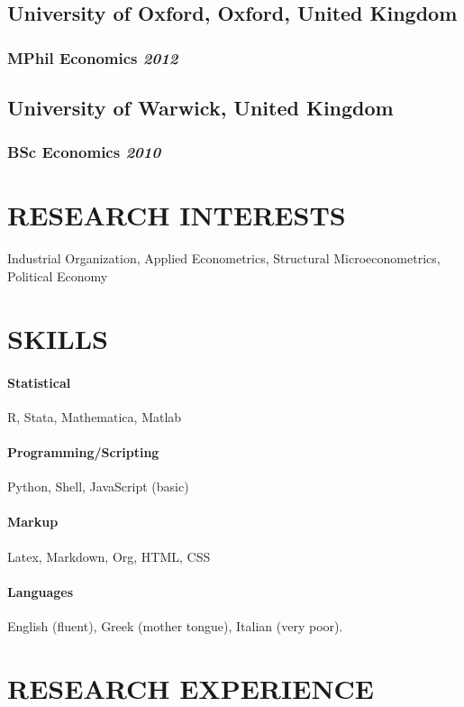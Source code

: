 \documentclass{article}
\begin{document}
\subsection{University of Oxford, Oxford, United Kingdom}
\subsubsection{MPhil Economics \hfill \emph{2012}}

\subsection{University of Warwick, United Kingdom}
\subsubsection{BSc Economics \hfill \emph{2010}}

\section{RESEARCH INTERESTS}
\noindent Industrial Organization, Applied Econometrics, Structural Microeconometrics, Political Economy

\section{SKILLS}
\paragraph{Statistical} R, Stata, Mathematica, Matlab
\paragraph{Programming/Scripting} Python, Shell, JavaScript (basic)
\paragraph{Markup} Latex, Markdown, Org, HTML, CSS
\paragraph{Languages} English (fluent), Greek (mother tongue), Italian (very poor).

\section{RESEARCH EXPERIENCE}
\end{document}
